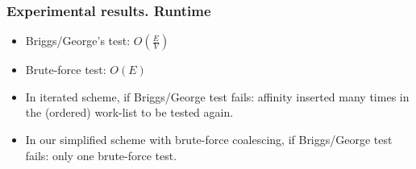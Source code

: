 \begin{frame}[label=past]
\frametitle{Experimental results. Runtime}
\begin{itemize}
\item Briggs/George's test: $O(\frac{E}{V})$ 
\item \textsf{Brute-force} test: $O(E)$
\item In iterated scheme, if Briggs/George test fails: affinity inserted many times in the (ordered) work-list to be tested again.
\item In our simplified scheme with \textsf{brute-force} coalescing, if
Briggs/George test fails: only one \textsf{brute-force} test.
\end{itemize}
\begin{center}

\end{center}
\end{frame}

